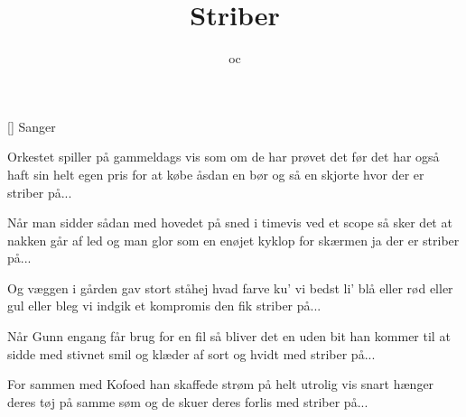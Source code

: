 \documentclass[a4paper,11pt]{article}
\title{Striber}
\author{oc}
\begin{document}
\maketitle

\begin{roles}
[] Sanger
\end{roles}

\begin{song}
  Orkestet spiller på gammeldags vis
som om de har prøvet det før
det har også haft sin helt egen pris
for at købe åsdan en bør
og så en skjorte hvor der er
striber på...

Når man sidder sådan med hovedet på sned
i timevis ved et scope
så sker det at nakken går af led
og man glor som en enøjet kyklop
for skærmen ja
der er striber på...

Og væggen i gården gav stort ståhej
hvad farve ku' vi bedst li'
blå eller rød eller gul eller bleg
vi indgik et kompromis
den fik striber på...

Når Gunn engang får brug for en fil
så bliver det en uden bit
han kommer til at sidde med stivnet smil
og klæder af sort og hvidt
med striber på...

For sammen med Kofoed han skaffede strøm
på helt utrolig vis
snart hænger deres tøj på samme søm
og de skuer deres forlis
med striber på...
\end{song}
\end{document}
